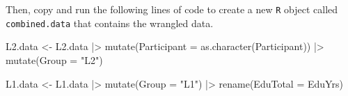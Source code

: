 \documentclass[
  letterpaper,
  DIV=11,
  numbers=noendperiod]{scrreprt}
\newenvironment{Shaded}{\begin{snugshade}}{\end{snugshade}}
\newcommand{\AttributeTok}[1]{\textcolor[rgb]{0.40,0.45,0.13}{#1}}
\newcommand{\FunctionTok}[1]{\textcolor[rgb]{0.28,0.35,0.67}{#1}}
\newcommand{\NormalTok}[1]{\textcolor[rgb]{0.00,0.23,0.31}{#1}}
\newcommand{\OtherTok}[1]{\textcolor[rgb]{0.00,0.23,0.31}{#1}}
\newcommand{\SpecialCharTok}[1]{\textcolor[rgb]{0.37,0.37,0.37}{#1}}
\newcommand{\StringTok}[1]{\textcolor[rgb]{0.13,0.47,0.30}{#1}}
\begin{document}
Then, copy and run the following lines of code to create a new
\texttt{R} object called \texttt{combined.data} that contains the
wrangled data.

\begin{Shaded}
\begin{Highlighting}[]
\NormalTok{L2.data }\OtherTok{\textless{}{-}}\NormalTok{ L2.data }\SpecialCharTok{|\textgreater{}} 
  \FunctionTok{mutate}\NormalTok{(}\AttributeTok{Participant =} \FunctionTok{as.character}\NormalTok{(Participant)) }\SpecialCharTok{|\textgreater{}} 
  \FunctionTok{mutate}\NormalTok{(}\AttributeTok{Group =} \StringTok{"L2"}\NormalTok{)  }

\NormalTok{L1.data }\OtherTok{\textless{}{-}}\NormalTok{ L1.data }\SpecialCharTok{|\textgreater{}} 
  \FunctionTok{mutate}\NormalTok{(}\AttributeTok{Group =} \StringTok{"L1"}\NormalTok{) }\SpecialCharTok{|\textgreater{}} 
  \FunctionTok{rename}\NormalTok{(}\AttributeTok{EduTotal =}\NormalTok{ EduYrs)}


\end{Highlighting}
\end{Shaded}
\end{document}
